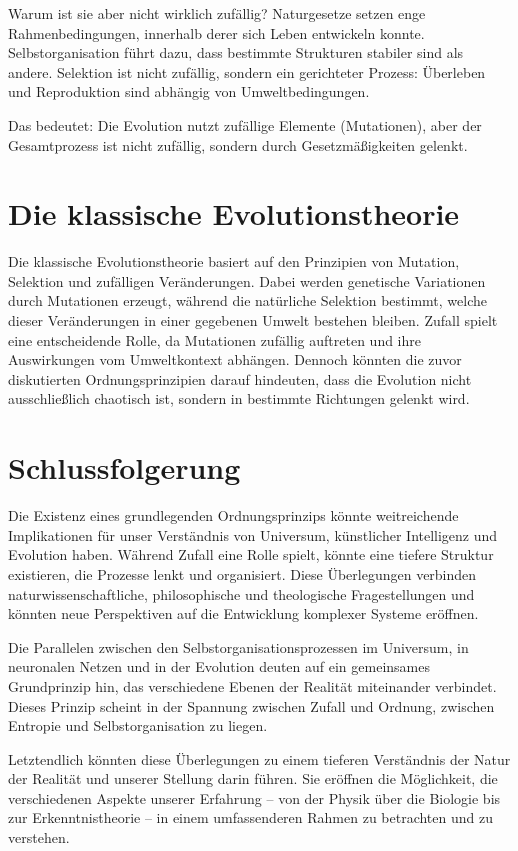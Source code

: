 \documentclass{article}
\begin{document}
	Warum ist sie aber nicht wirklich zufällig?
	Naturgesetze setzen enge Rahmenbedingungen, innerhalb derer sich Leben entwickeln konnte.
	Selbstorganisation führt dazu, dass bestimmte Strukturen stabiler sind als andere.
	Selektion ist nicht zufällig, sondern ein gerichteter Prozess: Überleben und Reproduktion sind abhängig von Umweltbedingungen.
	
	Das bedeutet: Die Evolution nutzt zufällige Elemente (Mutationen), aber der Gesamtprozess ist nicht zufällig, sondern durch Gesetzmäßigkeiten gelenkt.
	
	\section{Die klassische Evolutionstheorie}
	Die klassische Evolutionstheorie basiert auf den Prinzipien von Mutation, Selektion und zufälligen Veränderungen. Dabei werden genetische Variationen durch Mutationen erzeugt, während die natürliche Selektion bestimmt, welche dieser Veränderungen in einer gegebenen Umwelt bestehen bleiben. Zufall spielt eine entscheidende Rolle, da Mutationen zufällig auftreten und ihre Auswirkungen vom Umweltkontext abhängen. Dennoch könnten die zuvor diskutierten Ordnungsprinzipien darauf hindeuten, dass die Evolution nicht ausschließlich chaotisch ist, sondern in bestimmte Richtungen gelenkt wird.
	
	\section{Schlussfolgerung}
	Die Existenz eines grundlegenden Ordnungsprinzips könnte weitreichende Implikationen für unser Verständnis von Universum, künstlicher Intelligenz und Evolution haben. Während Zufall eine Rolle spielt, könnte eine tiefere Struktur existieren, die Prozesse lenkt und organisiert. Diese Überlegungen verbinden naturwissenschaftliche, philosophische und theologische Fragestellungen und könnten neue Perspektiven auf die Entwicklung komplexer Systeme eröffnen.
	
	Die Parallelen zwischen den Selbstorganisationsprozessen im Universum, in neuronalen Netzen und in der Evolution deuten auf ein gemeinsames Grundprinzip hin, das verschiedene Ebenen der Realität miteinander verbindet. Dieses Prinzip scheint in der Spannung zwischen Zufall und Ordnung, zwischen Entropie und Selbstorganisation zu liegen.
	
	Letztendlich könnten diese Überlegungen zu einem tieferen Verständnis der Natur der Realität und unserer Stellung darin führen. Sie eröffnen die Möglichkeit, die verschiedenen Aspekte unserer Erfahrung – von der Physik über die Biologie bis zur Erkenntnistheorie – in einem umfassenderen Rahmen zu betrachten und zu verstehen.
	
\end{document}
